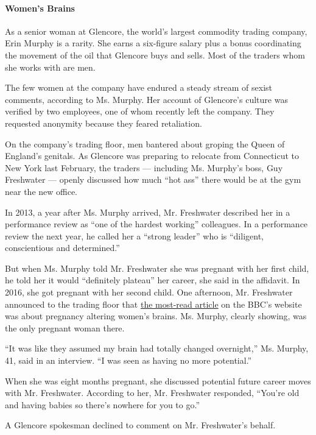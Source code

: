 \hypertarget{womens-brains}{%
\paragraph{Women's Brains}\label{womens-brains}}

As a senior woman at Glencore, the world's largest commodity trading
company, Erin Murphy is a rarity. She earns a six-figure salary plus a
bonus coordinating the movement of the oil that Glencore buys and sells.
Most of the traders whom she works with are men.

The few women at the company have endured a steady stream of sexist
comments, according to Ms. Murphy. Her account of Glencore's culture was
verified by two employees, one of whom recently left the company. They
requested anonymity because they feared retaliation.

On the company's trading floor, men bantered about groping the Queen of
England's genitals. As Glencore was preparing to relocate from
Connecticut to New York last February, the traders --- including Ms.
Murphy's boss, Guy Freshwater --- openly discussed how much ``hot ass''
there would be at the gym near the new office.

In 2013, a year after Ms. Murphy arrived, Mr. Freshwater described her
in a performance review as ``one of the hardest working'' colleagues. In
a performance review the next year, he called her a ``strong leader''
who is ``diligent, conscientious and determined.''

But when Ms. Murphy told Mr. Freshwater she was pregnant with her first
child, he told her it would ``definitely plateau'' her career, she said
in the affidavit. In 2016, she got pregnant with her second child. One
afternoon, Mr. Freshwater announced to the trading floor that
\href{http://www.bbc.com/news/health-38341901}{the most-read article} on
the BBC's website was about pregnancy altering women's brains. Ms.
Murphy, clearly showing, was the only pregnant woman there.

``It was like they assumed my brain had totally changed overnight,'' Ms.
Murphy, 41, said in an interview. ``I was seen as having no more
potential.''

When she was eight months pregnant, she discussed potential future
career moves with Mr. Freshwater. According to her, Mr. Freshwater
responded, ``You're old and having babies so there's nowhere for you to
go.''

A Glencore spokesman declined to comment on Mr. Freshwater's behalf.

